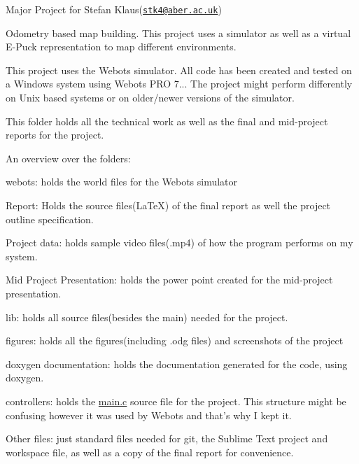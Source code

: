 Major Project for Stefan Klaus(\href{mailto:stk4@aber.ac.uk}{\tt stk4@aber.\+ac.\+uk})

Odometry based map building. This project uses a simulator as well as a virtual E-\/\+Puck representation to map different environments.

This project uses the Webots simulator. All code has been created and tested on a Windows system using Webots P\+R\+O 7... The project might perform differently on Unix based systems or on older/newer versions of the simulator.

This folder holds all the technical work as well as the final and mid-\/project reports for the project.

An overview over the folders\+:

webots\+: holds the world files for the Webots simulator

Report\+: Holds the source files(\+La\+Te\+X) of the final report as well the project outline specification.

Project data\+: holds sample video files(.mp4) of how the program performs on my system.

Mid Project Presentation\+: holds the power point created for the mid-\/project presentation.

lib\+: holds all source files(besides the main) needed for the project.

figures\+: holds all the figures(including .odg files) and screenshots of the project

doxygen documentation\+: holds the documentation generated for the code, using doxygen.

controllers\+: holds the \hyperlink{_main_8c}{main.\+c} source file for the project. This structure might be confusing however it was used by Webots and that's why I kept it.

Other files\+: just standard files needed for git, the Sublime Text project and workspace file, as well as a copy of the final report for convenience. 